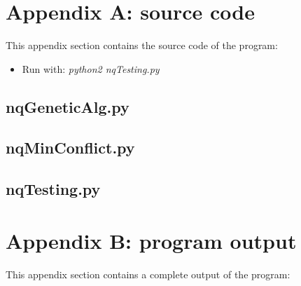 \documentclass[runningheads]{llncs}
\begin{document}
\section{Appendix A: source code}\label{appendix}
This appendix section contains the source code of the program:
\begin{itemize}
\item Run with: \textit{python2 nqTesting.py}
\end{itemize}

\subsection{nqGeneticAlg.py}\label{genetic}
%

\subsection{nqMinConflict.py}\label{minconflict}
%

\subsection{nqTesting.py}\label{testing}
%

\section{Appendix B: program output}\label{appendixB}
This appendix section contains a complete output of the program:
%
\end{document}
